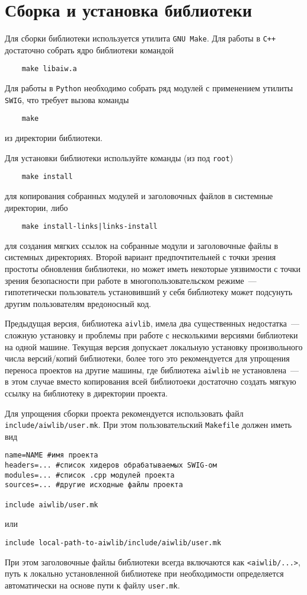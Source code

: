 \section{Сборка и установка библиотеки}
Для сборки библиотеки используется утилита \verb'GNU Make'.
Для работы в \verb'C++' достаточно собрать ядро библиотеки командой
\begin{verbatim}
    make libaiw.a
\end{verbatim}
Для работы в \verb'Python' необходимо собрать
ряд модулей с применением утилиты \verb'SWIG', что требует вызова команды 
\begin{verbatim}
    make
\end{verbatim}
из директории библиотеки.

Для установки библиотеки используйте команды (из под \verb'root')
\begin{verbatim}
    make install
\end{verbatim}
для копирования собранных модулей и заголовочных файлов в системные директории, либо
\begin{verbatim}
    make install-links|links-install
\end{verbatim}
для создания мягких ссылок на собранные модули и заголовочные файлы в системных директориях.
Второй вариант предпочтительней с точки зрения простоты обновления библиотеки, 
но может иметь некоторые уязвимости с точки зрения безопасности
при работе в многопользовательском режиме~--- 
гипотетически пользователь установивший у себя библиотеку может подсунуть другим пользователям вредоносный код.

Предыдущая версия, библиотека {\tt aivlib}, имела два существенных недостатка~--- сложную установку и проблемы при
работе с несколькими версиями библиотеки на одной машине. Текущая версия допускает локальную установку
произвольного числа версий/копий библиотеки, более того это рекомендуется для  
упрощения переноса проектов на другие машины, где библиотека \verb'aiwlib' не установлена~---
в этом случае вместо копирования всей библиотоеки достаточно создать мягкую ссылку на библиотеку в директории проекта.

Для упрощения сборки проекта рекомендуется использовать файл \verb'include/aiwlib/user.mk'.
При этом пользовательский \verb'Makefile' должен иметь вид
\begin{verbatim}
name=NAME #имя проекта
headers=... #список хидеров обрабатываемых SWIG-ом
modules=... #список .cpp модулей проекта
sources=... #другие исходные файлы проекта

include aiwlib/user.mk
\end{verbatim}
или
\begin{verbatim}
include local-path-to-aiwlib/include/aiwlib/user.mk
\end{verbatim}
При этом заголовочные файлы библиотеки всегда включаются как \verb'<aiwlib/...>',
путь к локально установленной библиотеке при необходимости определяется автоматически на основе пути к файлу \verb'user.mk'.

